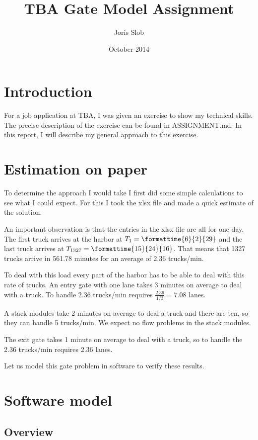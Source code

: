 \documentclass{article}
\begin{document}
\title{TBA Gate Model Assignment}
\author{Joris Slob}
\date{October 2014}
\maketitle

\section{Introduction}

For a job application at TBA, I was given an exercise to show my
technical skills. The precise description of the exercise can be found
in ASSIGNMENT.md. In this report, I will describe my general approach
to this exercise.

\section{Estimation on paper}

To determine the approach I would take I first did some simple
calculations to see what I could expect. For this I took the xlsx file
and made a quick estimate of the solution.

An important observation is that the entries in the xlsx file are all
for one day. The first truck arrives at the harbor at $T_1 =
\mbox{\formattime{6}{2}{29}}$ and the last truck arrives at $T_{1327}
= \mbox{\formattime{15}{24}{16}}$. That means that 1327 trucks arrive
in 561.78 minutes for an average of 2.36 trucks/min.

To deal with this load every part of the harbor has to be able to deal
with this rate of trucks. An entry gate with one lane takes 3 minutes
on average to deal with a truck. To handle 2.36 trucks/min requires
$\frac{2.36}{1/3} = 7.08$ lanes.

A stack modules take 2 minutes on average to deal a truck and there
are ten, so they can handle 5 trucks/min. We expect no flow problems
in the stack modules.

The exit gate takes 1 minute on average to deal with a truck, so to
handle the 2.36 trucks/min requires 2.36 lanes.

Let us model this gate problem in software to verify these results.

\section{Software model}

\subsection{Overview}
\end{document}
